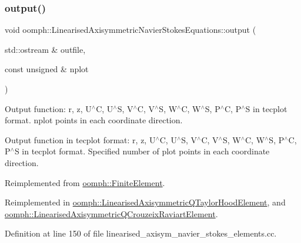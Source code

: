 \mbox{\label{classoomph_1_1LinearisedAxisymmetricNavierStokesEquations_af91220377d90bc7506327e4f1de9e42a}} 
\subsubsection{\texorpdfstring{output()}{output()}\hspace{0.1cm}{\footnotesize\ttfamily [2/4]}}
{\footnotesize\ttfamily void oomph\+::\+Linearised\+Axisymmetric\+Navier\+Stokes\+Equations\+::output (\begin{DoxyParamCaption}\item[{std\+::ostream \&}]{outfile,  }\item[{const unsigned \&}]{nplot }\end{DoxyParamCaption})\hspace{0.3cm}{\ttfamily [virtual]}}



Output function\+: r, z, U$^\wedge$C, U$^\wedge$S, V$^\wedge$C, V$^\wedge$S, W$^\wedge$C, W$^\wedge$S, P$^\wedge$C, P$^\wedge$S in tecplot format. nplot points in each coordinate direction. 

Output function in tecplot format\+: r, z, U$^\wedge$C, U$^\wedge$S, V$^\wedge$C, V$^\wedge$S, W$^\wedge$C, W$^\wedge$S, P$^\wedge$C, P$^\wedge$S in tecplot format. Specified number of plot points in each coordinate direction. 

Reimplemented from \hyperlink{classoomph_1_1FiniteElement_afa9d9b2670f999b43e6679c9dd28c457}{oomph\+::\+Finite\+Element}.



Reimplemented in \hyperlink{classoomph_1_1LinearisedAxisymmetricQTaylorHoodElement_a7d3a4a80bfc52257b5c9b5af6ed18f72}{oomph\+::\+Linearised\+Axisymmetric\+Q\+Taylor\+Hood\+Element}, and \hyperlink{classoomph_1_1LinearisedAxisymmetricQCrouzeixRaviartElement_a332ee735b33a99dae78a799f369b3069}{oomph\+::\+Linearised\+Axisymmetric\+Q\+Crouzeix\+Raviart\+Element}.



Definition at line 150 of file linearised\+\_\+axisym\+\_\+navier\+\_\+stokes\+\_\+elements.\+cc.




